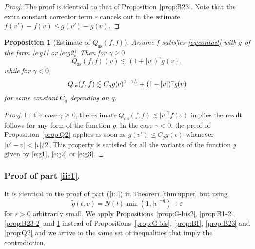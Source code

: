 \documentclass[JEP,XML,SOM,Unicode,NoFloatCountersInSection]{cedram}
\newcommand{\ns}{\mathrm{ns}}
\theoremstyle{plain}
\newtheorem{prop}[thm]{Proposition}
\theoremstyle{definition}
\numberwithin{equation}{section}
\newcommand{\eps}{\varepsilon}
\let\A N
\begin{document}
\begin{proof}
The proof is identical to that of Proposition~\ref{prop:B23}. Note
that the extra constant corrector term $\eps$ cancels out in the estimate
$f(v') - f(v) \leq g(v') - g(v)$.
\end{proof}

\begin{prop}[Estimate of $Q_{\ns}(f,f)$] \label{prop:Q2-2} Assume $f$
satisfies \eqref{eq:contact} with $g$ of the form \eqref{e:g1} or
\eqref{e:g2}. Then for $\gamma \ge 0$
\[ Q_{\ns}(f,f)(v) \lesssim (1+|v|)^{\gamma} g(v), \]
while for $\gamma <0$,
\[
Q_{\ns}(f,f) \lesssim C_q g(v)^{1-\sfrac{\gamma}{d}} +
(1+|v|)^\gamma g(v)
\]
for some constant $C_q$ depending on $q$.
\end{prop}

\begin{proof}
In the case $\gamma \geq 0$, the estimate
$Q_{\ns}(f,f) \lesssim |v|^{\gamma} f(v)$ implies the result follows
for any form of the function $g$. In the case $\gamma < 0$, the
proof of Proposition~\ref{prop:Q2} applies as soon as
$g(v') \leq C_q g(v)$ whenever $|v'-v| < |v|/2$. This property is
satisfied for all the variants of the function $g$ given by
\eqref{e:g1}, \eqref{e:g2} or \eqref{e:g3}.
\end{proof}


\subsubsection{Proof of part \eqref{ii:1}.} It is identical
to the proof of part (\ref{i:1}) in Theorem \ref{thm:upper} but using
\[\tilde g(t,v) = \A(t) \min(1,|v|^{-q}) + \eps\] for $\eps > 0$ arbitrarily
small. We apply Propositions~\ref{prop:G-bis2}, \ref{prop:B1-2},
\ref{prop:B23-2} and \ref{prop:Q2-2} instead of
Propositions~\ref{prop:G-bis}, \ref{prop:B1}, \ref{prop:B23} and
\ref{prop:Q2} and we arrive to the same set of inequalities that imply
the contradiction.
\end{document}
